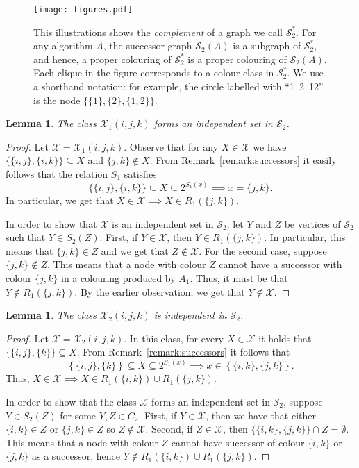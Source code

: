 \documentclass[a4paper,11pt]{article}
\newtheorem{lemma}[theorem]{Lemma}
\theoremstyle{remark}
\newcommand{\cS}{\mathcal{S}}
\begin{document}
\begin{figure}[p]
 \begin{center}
\texttt{[image: figures.pdf]}
 \end{center}
\caption{This illustrations shows the \emph{complement} of a graph we call $\cS_2^*$. For any algorithm $A$, the successor graph $\cS_2(A)$ is a subgraph of $\cS_2^*$, and hence, a proper colouring of $\cS_2^*$ is a proper colouring of $\cS_2(A)$. Each clique in the figure corresponds to a colour class in $\cS_2^*$. We use a shorthand notation: for example, the circle labelled with ``1~2~12'' is the node $\{\{1\},\{2\},\{1,2\}\}$. \label{fig:complement}}
\end{figure}

\begin{lemma}
 The class $\mathcal{X}_1(i,j,k)$ forms an independent set in $\cS_2$.
 \end{lemma}
\begin{proof}
 Let $\mathcal{X} = \mathcal{X}_1(i,j,k)$. Observe that for any $X \in \mathcal{X}$ we have $\big\{ \{i,j\}, \{i,k\} \big\} \subseteq X$ and $\{j,k\} \notin X$. From Remark~\ref{remark:successors} it easily follows that the relation $S_1$ satisfies 
\[
\big\{ \{i,j\}, \{i,k\} \big\} \subseteq X \subseteq 2^{S_1(x)} \implies x = \{j,k\}.
\]
In particular, we get that $X \in \mathcal{X} \implies X \in R_1(\{j,k\})$.

In order to show that $\mathcal{X}$ is an independent set in $\cS_2$, let $Y$ and $Z$ be vertices of $\cS_2$ such that $Y \in S_2(Z)$. First, if $Y \in \mathcal{X}$, then $Y \in R_1(\{j,k\})$. In particular, this means that $\{j,k\} \in Z$ and we get that $Z \notin \mathcal{X}$. For the second case, suppose $\{j,k\} \notin Z$. This means that a node with colour $Z$ cannot have a successor with colour $\{j,k\}$ in a colouring produced by $A_1$. Thus, it must be that $Y \notin R_1(\{j,k\})$. By the earlier observation, we get that $Y \notin \mathcal{X}$.
\end{proof}

\begin{lemma}
The class $\mathcal{X}_2(i,j,k)$ is independent in $\cS_2$. 
\end{lemma} 
\begin{proof}
Let $\mathcal{X} = \mathcal{X}_2(i,j,k)$. In this class, for every $X \in \mathcal{X}$ it holds that $\big\{ \{i,j\}, \{k\} \big\} \subseteq X$. From Remark~\ref{remark:successors} it follows that
\[
 \left\{ \{i,j\}, \{k\} \right\} \subseteq X \subseteq 2^{S_1(x)} \implies x \in \left\{ \{i,k\}, \{j,k\} \right\}. 
\]
Thus, $X \in \mathcal{X} \implies X \in R_1(\{i,k\}) \cup R_1(\{j,k\})$. 

In order to show that the class $\mathcal{X}$ forms an independent set in $\cS_2$, suppose $Y \in S_2(Z)$ for some $Y,Z \in C_2$. First, if $Y \in \mathcal{X}$, then we have that either $\{i,k\} \in Z$ or $\{j,k\} \in Z$ so $Z \notin \mathcal{X}$. Second, if $Z \in \mathcal{X}$, then $\big\{\{i,k\}, \{j,k\}\big\} \cap Z = \emptyset$. This means that a node with colour $Z$ cannot have successor of colour $\{i,k\}$ or $\{j,k\}$ as a successor, hence $Y \notin R_1(\{i,k\}) \cup R_1(\{j,k\})$.
\end{proof}
\end{document}
